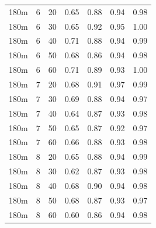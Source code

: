 \begin{table}
\begin{center}
\begin{tabular}{ccc|cccc}
   \hline
180m &   6 &  20 & 0.65 & 0.88 & 0.94 & 0.98 \\ 
  180m &   6 &  30 & 0.65 & 0.92 & 0.95 & 1.00 \\ 
  180m &   6 &  40 & 0.71 & 0.88 & 0.94 & 0.99 \\ 
  180m &   6 &  50 & 0.68 & 0.86 & 0.94 & 0.98 \\ 
  180m &   6 &  60 & 0.71 & 0.89 & 0.93 & 1.00 \\ 
   \hline
180m &   7 &  20 & 0.68 & 0.91 & 0.97 & 0.99 \\ 
  180m &   7 &  30 & 0.69 & 0.88 & 0.94 & 0.97 \\ 
  180m &   7 &  40 & 0.64 & 0.87 & 0.93 & 0.98 \\ 
  180m &   7 &  50 & 0.65 & 0.87 & 0.92 & 0.97 \\ 
  180m &   7 &  60 & 0.66 & 0.88 & 0.93 & 0.98 \\ 
   \hline
180m &   8 &  20 & 0.65 & 0.88 & 0.94 & 0.99 \\ 
  180m &   8 &  30 & 0.62 & 0.87 & 0.93 & 0.98 \\ 
  180m &   8 &  40 & 0.68 & 0.90 & 0.94 & 0.98 \\ 
  180m &   8 &  50 & 0.68 & 0.87 & 0.93 & 0.97 \\ 
  180m &   8 &  60 & 0.60 & 0.86 & 0.94 & 0.98 \\ 
   \hline
\end{tabular}
\end{center}
\end{table}

